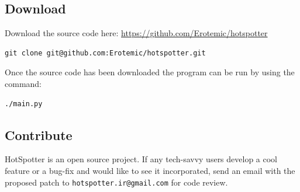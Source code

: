 \documentclass[a4paper,10pt]{article}
\makeatletter
\newcommand{\developeremail}{{\tt hotspotter.ir@gmail.com}}
\makeatother
\begin{document}
\subsection{Download}
Download the source code here: \url{https://github.com/Erotemic/hotspotter}
\begin{Verbatim}[commandchars=\\\{\}]
git clone git@github.com:Erotemic/hotspotter.git
\end{Verbatim}


Once the source code has been downloaded the program can be run by using the command:
\begin{Verbatim}[commandchars=\\\{\}]
./main.py
\end{Verbatim}



\subsection{Contribute}
HotSpotter is an open source project. If any tech-savvy users develop a cool
feature or a bug-fix and would like to see it incorporated, send an email with the proposed
patch to \developeremail{} for code review.

\newpage
\end{document}
